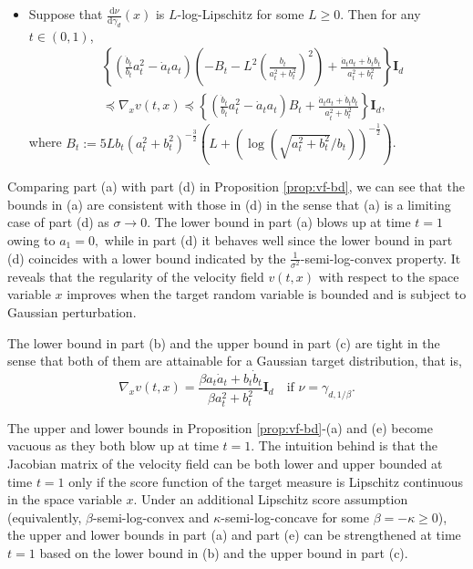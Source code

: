 \documentclass[twoside,11pt]{article}
\def\rmI{{\mathbf{I}}}
\newcommand{\diff}{\mathrm{d}}
\numberwithin{equation}{section}
\begin{document}
\begin{proposition}
\begin{itemize}
    \item[(e)] Suppose that $\frac{\diff \nu}{\diff \gamma_d}(x)$ is $L$-log-Lipschitz for some $L \ge 0$. Then for any $t \in (0, 1)$,
    \begin{align*}
        & \left\{ \left( \tfrac{\dot{b}_t}{b_t} a_t^2 - \dot{a}_t a_t \right) \left( -B_t - L^2 \left( \tfrac{b_t}{a_t^2 + b_t^2} \right)^2 \right) + \tfrac{\dot{a}_t a_t + \dot{b}_t b_t}{a_t^2 + b_t^2} \right\} \rmI_d \\
        & \preceq \nabla_x v(t, x)
          \preceq \left\{ \left( \tfrac{\dot{b}_t}{b_t} a_t^2 - \dot{a}_t a_t \right) B_t + \tfrac{\dot{a}_t a_t + \dot{b}_t b_t}{a_t^2 + b_t^2} \right\} \rmI_d,
    \end{align*}
    where $B_t := 5L b_t (a_t^2 + b_t^2)^{-\frac32} (L + (\log (\sqrt{a_t^2 + b_t^2}/b_t))^{-\frac12})$.
\end{itemize}
\end{proposition}

Comparing part (a) with part (d) in Proposition \ref{prop:vf-bd}, we can see that the bounds in (a) are consistent with those in (d) in the sense that (a) is a limiting case of part (d) as $\sigma \to 0$. The lower bound in part (a) blows up at time $t = 1$ owing to $a_1 = 0,$ while in part (d) it behaves well since the lower bound in part (d) coincides with a lower bound indicated by the $\tfrac{1}{\sigma^2}$-semi-log-convex property. It reveals that the regularity of the velocity field $v(t, x)$ with respect to the space variable $x$ improves when the target random variable is bounded and is subject to Gaussian perturbation.

The lower bound in part (b) and the upper bound in part (c) are tight in the sense that both of them are attainable for a Gaussian target distribution, that is,
\begin{equation*}
    \nabla_x v(t, x) = \frac{\beta a_t \dot{a}_t + b_t \dot{b}_t} {\beta a_t^2 + b_t^2} \rmI_d \quad \text{if $\nu = \gamma_{d, 1/\beta}$.}
\end{equation*}

The upper and lower bounds in Proposition \ref{prop:vf-bd}-(a) and (e) become vacuous as they both blow up at time $t = 1$. The intuition behind is that the Jacobian matrix of the velocity field can be both lower and upper bounded at time $t = 1$ only if the score function of the target measure is Lipschitz continuous in the space variable $x$. Under an additional Lipschitz score assumption (equivalently, $\beta$-semi-log-convex and $\kappa$-semi-log-concave for some $\beta = -\kappa \ge 0$), the upper and lower bounds in part (a) and part (e) can be strengthened at time $t = 1$ based on the lower bound in (b) and the upper bound in part (c).
\end{document}
